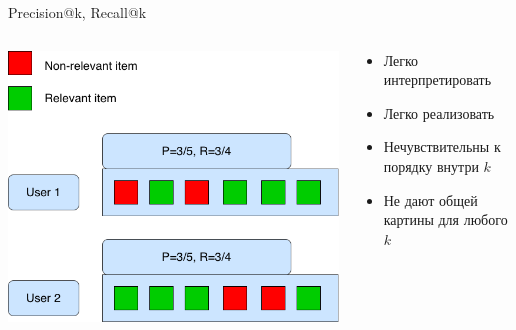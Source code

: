 \documentclass[11pt,aspectratio=169,handout]{beamer}
\begin{document}
\begin{frame}{Precision@k, Recall@k}

\begin{columns}
\begin{column}{0.5\textwidth}
   \begin{center}
		\includegraphics[scale=0.22]{images/precision-recall.png}
   \end{center}
\end{column}
\begin{column}{0.4\textwidth}
    \begin{tcolorbox}[colback=info!5,colframe=info!80,title=]
      \begin{itemize}
      \item Легко интерпретировать
      \item Легко реализовать
      \end{itemize}
    \end{tcolorbox}
    \begin{tcolorbox}[colback=warn!5,colframe=warn!80,title=]
      \begin{itemize}
      \item Нечувствительны к порядку внутри $k$
      \item Не дают общей картины для любого $k$
      \end{itemize}
    \end{tcolorbox}
\end{column}
\end{columns}

\end{frame}
\end{document}
